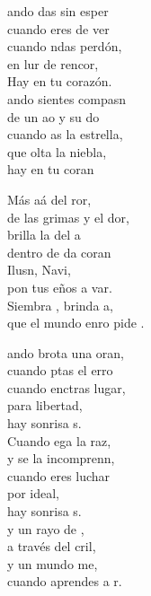 \begin{cancion}%
	ando das sin esper\\
	cuando eres de ver\\
	cuando ndas perdón,\\
	en lur de rencor,\\
	Hay  en tu corazón.\\
	ando sientes compasn\\
	de un ao y su do\\
	cuando as la estrella,\\
	que olta la niebla,\\
	hay  en tu coran\jump\\
	\begin{chorus}%
		Más aá del ror,\\
		de las grimas y el dor, \\
		brilla la  del a\\
		dentro de da coran\\
		Ilusn, Navi, \\
		pon tus eños a var.\\
		Siembra , brinda a,\\
		que el mundo enro pide .\jump\\
	\end{chorus}%
	ando brota una oran, \\
	cuando ptas el erro\\
	cuando enctras lugar,\\
	para  libertad,\\
	hay  sonrisa s.\\
	Cuando ega la raz,\\
	y se la incomprenn,\\
	cuando eres luchar\\
	por  ideal,\\
	hay  sonrisa s.\\
	\jump
	y un rayo de ,\\
	a través del cril,  \\
	y un mundo me,\\
	cuando aprendes a r.\\
\end{cancion}%
